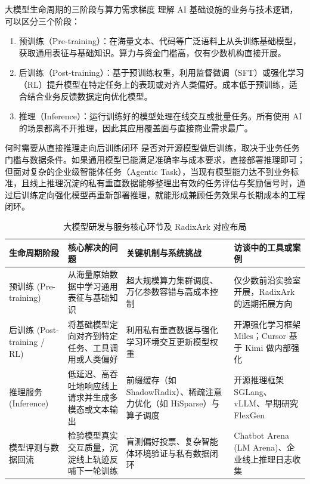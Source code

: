 \documentclass[UTF8,a4paper,11pt,fontset=fandol]{ctexart}
\begin{document}
\begin{knowledgebox}{大模型生命周期的三阶段与算力需求梯度}
理解 AI 基础设施的业务与技术逻辑，可以区分三个阶段：
\begin{enumerate}
\item 预训练（Pre-training）：在海量文本、代码等广泛语料上从头训练基础模型，获取通用表征与基础知识。算力与资金门槛高，仅有少数机构直接开展。
\item 后训练（Post-training）：基于预训练权重，利用监督微调（SFT）或强化学习（RL）提升模型在特定任务上的表现或对齐人类偏好。成本低于预训练，适合结合业务反馈数据定向优化模型。
\item 推理（Inference）：运行训练好的模型处理在线交互或批量任务。所有使用 AI 的场景都离不开推理，因此其应用覆盖面与直接商业需求最广。
\end{enumerate}
\end{knowledgebox}
\begin{warningbox}{何时需要从直接推理走向后训练闭环}
是否对开源模型做后训练，取决于业务任务门槛与数据条件。如果通用模型已能满足准确率与成本要求，直接部署推理即可；但面对复杂的企业级智能体任务（Agentic Task），当现有模型能力达不到业务标准，且线上推理沉淀的私有垂直数据能够整理出有效的任务评估与奖励信号时，通过后训练定向强化模型再重新部署推理，就能形成兼顾任务效果与长期成本的工程闭环。
\end{warningbox}
\begin{table}[H]\centering\small
\caption{大模型研发与服务核心环节及 RadixArk 对应布局}
\begin{tabular}{>{\raggedright\arraybackslash}p{\dimexpr(\linewidth-8\tabcolsep)/4\relax}>{\raggedright\arraybackslash}p{\dimexpr(\linewidth-8\tabcolsep)/4\relax}>{\raggedright\arraybackslash}p{\dimexpr(\linewidth-8\tabcolsep)/4\relax}>{\raggedright\arraybackslash}p{\dimexpr(\linewidth-8\tabcolsep)/4\relax}}
\toprule
生命周期阶段 & 核心解决的问题 & 关键机制与系统挑战 & 访谈中的工具或案例\\\midrule
预训练 (Pre-training) & 从海量原始数据中学习通用表征与基础知识 & 超大规模算力集群调度、万亿参数容错与高成本控制 & 仅少数前沿实验室开展，RadixArk 的远期拓展方向\\[4pt]
后训练 (Post-training / RL) & 将基础模型定向对齐到特定任务、工具调用或人类偏好 & 利用私有垂直数据与强化学习环境交互更新模型权重 & 开源强化学习框架 Miles；Cursor 基于 Kimi 做内部强化\\[4pt]
推理服务 (Inference) & 低延迟、高吞吐地响应线上请求并生成多模态或文本输出 & 前缀缓存（如 ShadowRadix）、稀疏注意力优化（如 HiSparse）与算子调度 & 开源推理框架 SGLang、vLLM、早期研究 FlexGen\\[4pt]
模型评测与数据回流 & 检验模型真实交互质量，沉淀线上轨迹反哺下一轮训练 & 盲测偏好投票、复杂智能体环境验证与私有数据闭环 & Chatbot Arena (LM Arena)、企业线上推理日志收集\\[4pt]
\bottomrule\end{tabular}\end{table}
\end{document}
